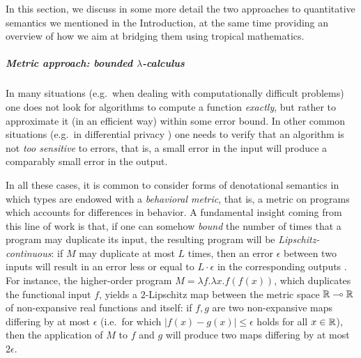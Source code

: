 
In this section, we discuss in some more detail the two approaches to quantitative semantics we mentioned in the Introduction, at the same time providing an overview of how we aim at bridging them using tropical mathematics.

\subparagraph*{Metric approach: bounded $\lambda$-calculus%
}


In many situations (e.g.~when dealing with computationally difficult problems) one does not look for algorithms to compute a function \emph{exactly}, but rather to approximate it (in an efficient way) within some error bound. In other common situations (e.g.~in differential privacy \cite{Alvim2011, Reed2010}) one needs to verify that an algorithm is not \emph{too sensitive} to errors, that is, a small error in the input will produce a comparably small error in the output. 

In all these cases, it is common to consider forms of denotational semantics in which types are endowed with a \emph{behavioral metric}, that is, a metric on programs which accounts for differences in behavior. 
A fundamental insight coming from this line of work is that, if one can somehow   \emph{bound} the number of times that a program may duplicate its input, the resulting program will be \emph{Lipschitz-continuous}:  
if $M$ may duplicate at most $L$ times, then an error $\epsilon$ between two inputs will result in an error less or equal to $L\cdot \epsilon$ in the corresponding outputs \cite{Reed2010, Gaboardi2017}.
For instance, the higher-order program $M=\lambda f.\lambda x.f(f(x))$, which duplicates the functional input $f$, yields a $2$-Lipschitz map between the metric space $\mathbb{R}\multimap \mathbb{R}$ of non-expansive real functions and itself: if $f,g$ are two non-expansive maps differing by at most $\epsilon$ (i.e.~for which $|f(x)-g(x)|\leq \epsilon$ holds for all $x\in \mathbb{R}$), then the application of $M$ to $f$ and $g$ will produce two maps differing by at most $2\epsilon$. 

%

